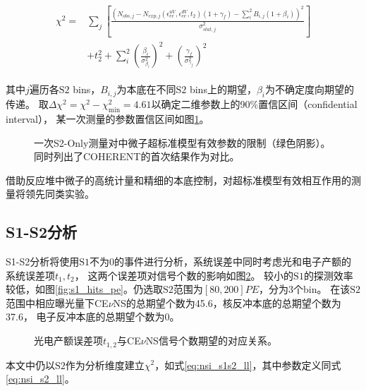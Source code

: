 \begin{align}
    \label{eq:nsi_s2_ll}
    \begin{split}
    \chi^2 =& \sum_j\left[\frac{\left(N_{obs,j} - N_{exp,j}(\epsilon^{uV}_{ee}, \epsilon^{dV}_{ee}, t_2)(1 + \gamma_f) 
    - \sum_{i}^2 B_{i,j}(1 + \beta_i)\right)^2}{\sigma^2_{stat,j}}\right] \\
    & + t_2^2 + \sum_{i}^2(\frac{\beta_i}{\sigma^2_{\beta_i}})^2 + (\frac{\gamma_f}{\sigma^2_{\gamma_f}})^2
    \end{split}
\end{align}

其中$j$遍历各$\mathrm{S2}$ bins，$B_{i,j}$为本底在不同$\mathrm{S2}$ bins上的期望，$\beta_i$为不确定度向期望的传递。
取$\Delta \chi^2=\chi^2-\chi^2_\mathrm{min}=4.61$以确定二维参数上的90\%置信区间（confidential interval），
某一次测量的参数置信区间如图\ref{fig:nsi_sensitivity_s2only}。

\begin{figure}
  \centering
  
  \caption{\label{fig:nsi_sensitivity_s2only} 一次S2-Only测量对中微子超标准模型有效参数的限制（绿色阴影）。
  同时列出了COHERENT的首次结果作为对比\cite{akimov_observation_2017}。}
\end{figure}

借助反应堆中微子的高统计量和精细的本底控制，对超标准模型有效相互作用的测量将领先同类实验。

\subsection{S1-S2分析}

S1-S2分析将使用$\mathrm{S1}$不为0的事件进行分析，系统误差中同时考虑光和电子产额的系统误差项$t_1,t_2$，
这两个误差项对信号个数的影响如图\ref{fig:exp_s1s2_t1t2}。
较小的$\mathrm{S1}$的探测效率较低，如图\ref{fig:s1_hits_pe}。仍选取$\mathrm{S2}$范围为$[80, 200]\si{PE}$，分为3个bin。
在该$\mathrm{S2}$范围中相应曝光量下CE$\nu$NS的总期望个数为45.6，核反冲本底的总期望个数为37.6，
电子反冲本底的总期望个数为0。

\begin{figure}
  \centering
  
  \caption{\label{fig:exp_s1s2_t1t2} 光电产额误差项$t_{1,2}$与CE$\nu$NS信号个数期望的对应关系。}
\end{figure}

本文中仍以$\mathrm{S2}$作为分析维度建立$\chi^2$，如式\ref{eq:nsi_s1s2_ll}，其中参数定义同式\ref{eq:nsi_s2_ll}。

